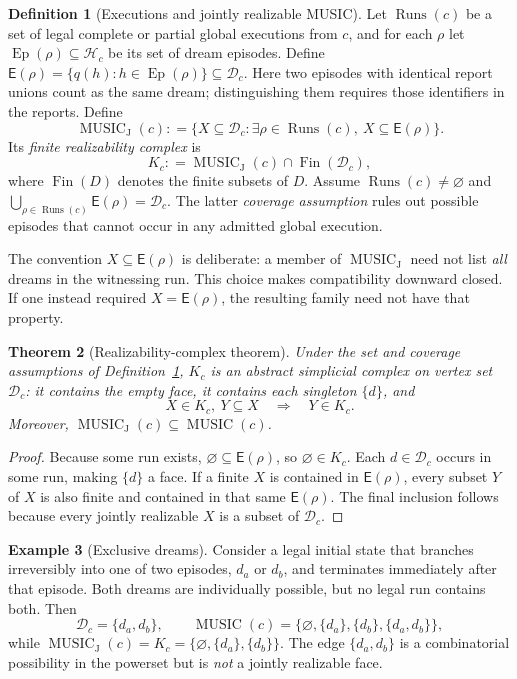 \documentclass[11pt,letterpaper]{article}
\newtheorem{theorem}{Theorem}[section]
\theoremstyle{definition}
\newtheorem{definition}[theorem]{Definition}
\newtheorem{example}[theorem]{Example}
\theoremstyle{remark}
\newcommand{\Dream}{\mathcal{D}}
\newcommand{\Music}{\operatorname{MUSIC}}
\newcommand{\JMusic}{\operatorname{MUSIC}_{\mathrm J}}
\newcommand{\Fin}{\operatorname{Fin}}
\newcommand{\Runs}{\operatorname{Runs}}
\newcommand{\Def}{\mathrel{\mathop:}=}
\newcommand{\blank}{\varnothing}
\begin{document}
\begin{definition}[Executions and jointly realizable MUSIC]\label{def:joint}
Let $\Runs(c)$ be a set of legal complete or partial global executions from $c$, and for each $\rho$ let $\operatorname{Ep}(\rho)\subseteq\mathcal H_c$ be its set of dream episodes. Define $\mathsf E(\rho)=\{q(h):h\in\operatorname{Ep}(\rho)\}\subseteq\Dream_c$. Here two episodes with identical report unions count as the same dream; distinguishing them requires those identifiers in the reports. Define
\begin{equation}\label{eq:joint}
\JMusic(c)\Def
 \big\{X\subseteq\Dream_c:\exists\rho\in\Runs(c),\ X\subseteq\mathsf E(\rho)\big\}.
\end{equation}
Its \emph{finite realizability complex} is
\begin{equation}\label{eq:complex}
K_c\Def\JMusic(c)\cap\Fin(\Dream_c),
\end{equation}
where $\Fin(D)$ denotes the finite subsets of $D$. Assume $\Runs(c)\ne\varnothing$ and $\bigcup_{\rho\in\Runs(c)}\mathsf E(\rho)=\Dream_c$. The latter \emph{coverage assumption} rules out possible episodes that cannot occur in any admitted global execution.
\end{definition}
The convention $X\subseteq\mathsf E(\rho)$ is deliberate: a member of $\JMusic$ need not list \emph{all} dreams in the witnessing run. This choice makes compatibility downward closed. If one instead required $X=\mathsf E(\rho)$, the resulting family need not have that property.

\begin{theorem}[Realizability-complex theorem]\label{thm:simplicial}
Under the set and coverage assumptions of Definition~\ref{def:joint}, $K_c$ is an abstract simplicial complex on vertex set $\Dream_c$: it contains the empty face, it contains each singleton $\{d\}$, and
\[
X\in K_c,\ Y\subseteq X\quad\Longrightarrow\quad Y\in K_c.
\]
Moreover, $\JMusic(c)\subseteq\Music(c)$.
\end{theorem}
\begin{proof}
Because some run exists, $\blank\subseteq\mathsf E(\rho)$, so $\blank\in K_c$. Each $d\in\Dream_c$ occurs in some run, making $\{d\}$ a face. If a finite $X$ is contained in $\mathsf E(\rho)$, every subset $Y$ of $X$ is also finite and contained in that same $\mathsf E(\rho)$. The final inclusion follows because every jointly realizable $X$ is a subset of $\Dream_c$.
\end{proof}

\begin{example}[Exclusive dreams]\label{ex:exclusive}
Consider a legal initial state that branches irreversibly into one of two episodes, $d_a$ or $d_b$, and terminates immediately after that episode. Both dreams are individually possible, but no legal run contains both. Then
\[
\Dream_c=\{d_a,d_b\},\qquad
\Music(c)=\{\blank,\{d_a\},\{d_b\},\{d_a,d_b\}\},
\]
while $\JMusic(c)=K_c=\{\blank,\{d_a\},\{d_b\}\}$. The edge $\{d_a,d_b\}$ is a combinatorial possibility in the powerset but is \emph{not} a jointly realizable face.
\end{example}
\end{document}
